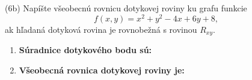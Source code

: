 \pr (6b) Napíšte všeobecnú rovnicu dotykovej roviny ku grafu funkcie $$f(x,y)=x^2+y^2-4x+6y+8,$$ ak hľadaná dotyková rovina je rovnobežná s rovinou $R_{xy}$.

\begin{enumerate}

\item[]\textbf{Súradnice dotykového bodu sú:} \gr
\item[]\textbf{Všeobecná rovnica dotykovej roviny je:} \gr
\end{enumerate}
